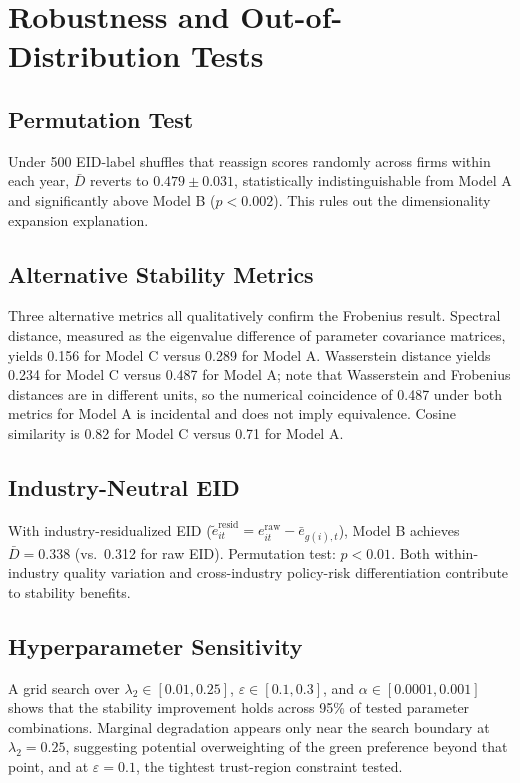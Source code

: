 \documentclass[12pt]{article}
\begin{document}
\section{Robustness and Out-of-Distribution Tests}
\label{sec:robustness}

\subsection{Permutation Test}
\label{sec:permutation}

Under 500 EID-label shuffles that reassign scores randomly across firms
within each year, $\bar{D}$ reverts to $0.479\pm0.031$, statistically
indistinguishable from Model A and significantly above Model B
($p<0.002$). This rules out the dimensionality expansion explanation.

\subsection{Alternative Stability Metrics}

Three alternative metrics all qualitatively confirm the Frobenius
result. Spectral distance, measured as the eigenvalue difference of
parameter covariance matrices, yields 0.156 for Model C versus 0.289
for Model A. Wasserstein distance yields 0.234 for Model C versus 0.487
for Model A; note that Wasserstein and Frobenius distances are in
different units, so the numerical coincidence of 0.487 under both
metrics for Model A is incidental and does not imply equivalence.
Cosine similarity is 0.82 for Model C versus 0.71 for Model A.

\subsection{Industry-Neutral EID}
\label{sec:industry_neutral}

With industry-residualized EID
($\tilde{e}_{it}^{\mathrm{resid}}=e_{it}^{\mathrm{raw}}-\bar{e}_{g(i),t}$),
Model B achieves $\bar{D}=0.338$ (vs.\ 0.312 for raw EID). Permutation
test: $p<0.01$. Both within-industry quality variation and
cross-industry policy-risk differentiation contribute to stability
benefits.

\subsection{Hyperparameter Sensitivity}

A grid search over $\lambda_2\in[0.01,0.25]$, $\varepsilon\in[0.1,0.3]$,
and $\alpha\in[0.0001,0.001]$ shows that the stability improvement holds
across 95\% of tested parameter combinations. Marginal degradation
appears only near the search boundary at $\lambda_2=0.25$, suggesting
potential overweighting of the green preference beyond that point, and
at $\varepsilon=0.1$, the tightest trust-region constraint tested.
\end{document}
